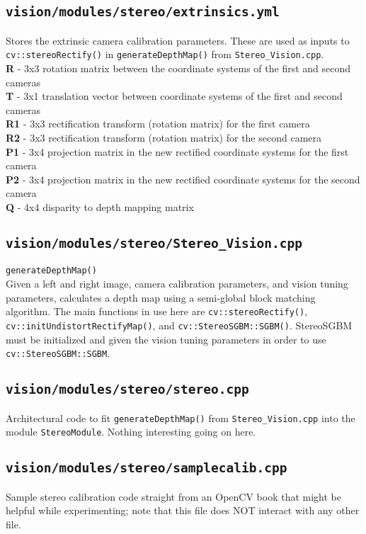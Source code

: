 \documentclass[11pt]{article}
\begin{document}
    \subsection{\texttt{vision/modules/stereo/extrinsics.yml}}
    Stores the extrinsic camera calibration parameters. These are used as inputs to \texttt{cv::stereoRectify()} in \texttt{generateDepthMap()} from \texttt{Stereo\_Vision.cpp}. \\
    \textbf{R} - 3x3 rotation matrix between the coordinate systems of the first and second cameras \\
    \textbf{T} - 3x1 translation vector between coordinate systems of the first and second cameras \\
    \textbf{R1} - 3x3 rectification transform (rotation matrix) for the first camera \\
    \textbf{R2} - 3x3 rectification transform (rotation matrix) for the second camera \\
    \textbf{P1} - 3x4 projection matrix in the new rectified coordinate systems for the first camera \\
    \textbf{P2} - 3x4 projection matrix in the new rectified coordinate systems for the second camera \\
    \textbf{Q} - 4x4 disparity to depth mapping matrix \\
    \subsection{\texttt{vision/modules/stereo/Stereo\_Vision.cpp}}
    \texttt{generateDepthMap()} \\
    Given a left and right image, camera calibration parameters, and vision tuning parameters, calculates a depth map using a semi-global block matching algorithm. The main functions in use here are \texttt{cv::stereoRectify()}, \texttt{cv::initUndistortRectifyMap()}, and \texttt{cv::StereoSGBM::SGBM()}. StereoSGBM must be initialized and given the vision tuning parameters in order to use \texttt{cv::StereoSGBM::SGBM}.

    \subsection{\texttt{vision/modules/stereo/stereo.cpp}}
    Architectural code to fit \texttt{generateDepthMap()} from \texttt{Stereo\_Vision.cpp} into the module \texttt{StereoModule}. Nothing interesting going on here.
    \subsection{\texttt{vision/modules/stereo/samplecalib.cpp}}
    Sample stereo calibration code straight from an OpenCV book that might be helpful while experimenting; note that this file does NOT interact with any other file.
\end{document}

